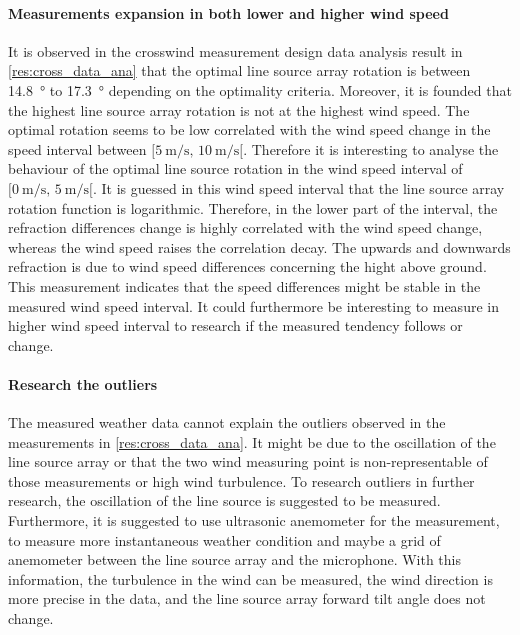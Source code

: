 \paragraph{Measurements expansion in both lower and higher wind speed} 
It is observed in the crosswind measurement design data analysis result in \autoref{res:cross_data_ana} that the optimal line source array rotation is between \SI{14.8}{\degree} to \SI{17.3}{\degree} depending on the optimality criteria. Moreover, it is founded that the highest line source array rotation is not at the highest wind speed. The optimal rotation seems to be low correlated with the wind speed change in the speed interval between $[\SI{5}{\meter\per\second},\, \SI{10}{\meter\per\second}[ $. Therefore it is interesting to analyse the behaviour of the optimal line source rotation in the wind speed interval of $[\SI{0}{\meter\per\second},\, \SI{5}{\meter\per\second}[ $. It is guessed in this wind speed interval that the line source array rotation function is logarithmic. Therefore, in the lower part of the interval, the refraction differences change is highly correlated with the wind speed change, whereas the wind speed raises the correlation decay. The upwards and downwards refraction is due to wind speed differences concerning the hight above ground. This measurement indicates that the speed differences might be stable in the measured wind speed interval. It could furthermore be interesting to measure in higher wind speed interval to research if the measured tendency follows or change. 



\paragraph{Research the outliers}
The measured weather data cannot explain the outliers observed in the measurements in \autoref{res:cross_data_ana}. It might be due to the oscillation of the line source array or that the two wind measuring point is non-representable of those measurements or high wind turbulence. To research outliers in further research, the oscillation of the line source is suggested to be measured. Furthermore, it is suggested to use ultrasonic anemometer for the measurement, to measure more instantaneous weather condition and maybe a grid of anemometer between the line source array and the microphone. With this information, the turbulence in the wind can be measured, the wind direction is more precise in the data, and the line source array forward tilt angle does not change. 




